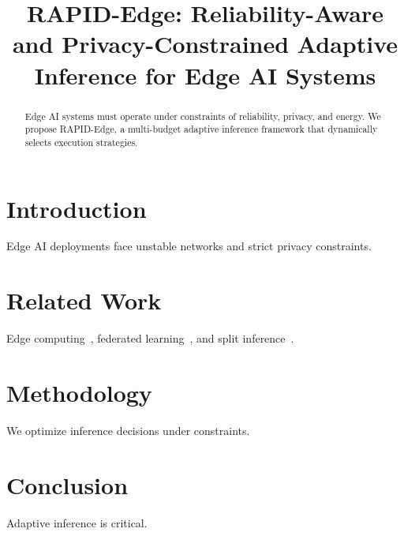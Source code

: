 \documentclass[10pt,conference]{IEEEtran}
\title{RAPID-Edge: Reliability-Aware and Privacy-Constrained Adaptive Inference for Edge AI Systems}
\author{\IEEEauthorblockN{Viswanadh Kakani}}
\begin{document}
\maketitle
\begin{abstract}
Edge AI systems must operate under constraints of reliability, privacy, and energy. We propose RAPID-Edge, a multi-budget adaptive inference framework that dynamically selects execution strategies.\end{abstract}
\section{Introduction}
Edge AI deployments face unstable networks and strict privacy constraints.
\section{Related Work}
Edge computing~\cite{satya}, federated learning~\cite{mcmahan}, and split inference~\cite{kang}.
\section{Methodology}
We optimize inference decisions under constraints.
\section{Conclusion}
Adaptive inference is critical.


\end{document}

